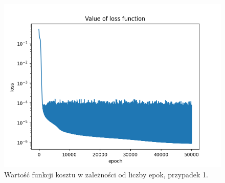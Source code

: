 \documentclass[11pt, leqno]{scrartcl}
\begin{document}
    \begin{figure}[H]
        \centering
        \includegraphics[width=0.7\linewidth]{nn_a_loss.png}
        \caption{Wartość funkcji kosztu w zależności od liczby epok,
            przypadek 1.}
    \end{figure}
\end{document}
